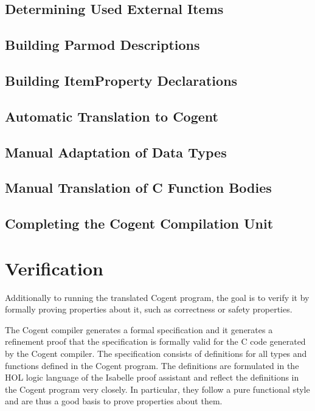 \documentclass[a4paper]{report}
\begin{document}
\section{Determining Used External Items}
\label{app-items}


\section{Building Parmod Descriptions}
\label{app-parmod}


\section{Building ItemProperty Declarations}
\label{app-itemprops}


\section{Automatic Translation to Cogent}
\label{app-transauto}


\section{Manual Adaptation of Data Types}
\label{app-transtype}


\section{Manual Translation of C Function Bodies}
\label{app-transfunction}


\section{Completing the Cogent Compilation Unit}
\label{app-unit}
%

\chapter{Verification}

Additionally to running the translated Cogent program, the goal is to verify it by formally proving properties
about it, such as correctness or safety properties.

The Cogent compiler generates a formal specification and it generates a refinement proof that the specification
is formally valid for the C code generated by the Cogent compiler. The specification consists of definitions for
all types and functions defined in the Cogent program. The definitions are formulated in the HOL logic language
of the Isabelle proof assistant and reflect the definitions in the Cogent program very closely. In particular,
they follow a pure functional style and are thus a good basis to prove properties about them.
\end{document}
